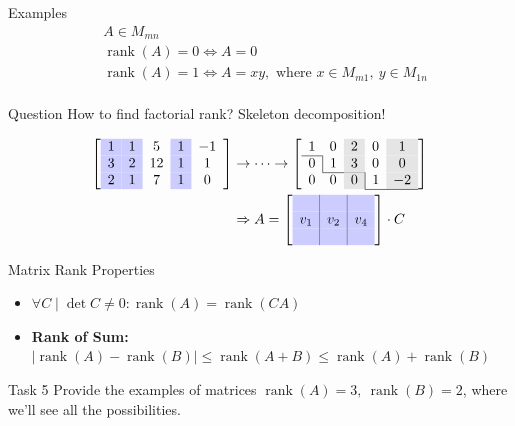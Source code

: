 \documentclass[fullscreen=true, bookmarks=true, hyperref={pdfencoding=unicode}]{beamer}
\begin{document}
\begin{frame}{Examples}
  \begin{align*}
    &A \in M_{mn} \\
    &\operatorname{rank}(A) = 0 \Leftrightarrow A = 0 \\
    &\operatorname{rank}(A) = 1 \Leftrightarrow A = xy, \text{ where } x \in M_{m1},\  y \in M_{1n} \\
  \end{align*}
  \vspace{-1cm}
  \begin{block}{Question}
    How to find factorial rank? Skeleton decomposition!
  \end{block}
  \pause
  \begin{align*}
    \left[\begin{array}{>{\columncolor{blue!20}}c >{\columncolor{blue!20}}c c >{\columncolor{blue!20}}c c}
      1 & 1 & 5 & 1 & -1 \\
      3 & 2 & 12 & 1 & 1 \\
      2 & 1 & 7 & 1 & 0 
    \end{array}\right] &\to \dots \to 
    \left[\begin{array}{c c >{\columncolor{gray!20}}c c >{\columncolor{gray!20}}c}
      1 & 0 & 2 & 0 & 1 \\
      \cline{1-1}
      0 & \multicolumn{1}{|c}{1} & 3 & 0 & 0 \\
      \cline{2-3}
      0 & 0 & 0 & \multicolumn{1}{|c}{1} & -2 \\
      \cline{4-5}
      \end{array}\right] \\
      & \Rightarrow A = 
      \left[\begin{array}{>{\columncolor{blue!20}}c|>{\columncolor{blue!20}}c|>{\columncolor{blue!20}}c}
        &     &    \\
        v_1 & v_2 & v_4 \\
            &     &    
      \end{array}\right] \cdot C 
  \end{align*}
\end{frame}


\begin{frame}{Matrix Rank Properties}
  \begin{itemize}
    \item $\forall C \mid \det C \neq 0: \operatorname{rank}(A) = \operatorname{rank}(CA)$
    \pause
    \item \textbf{Rank of Sum:} $|\operatorname{rank}(A) - \operatorname{rank}(B)| \le \operatorname{rank}(A+B) \le \operatorname{rank}(A) + \operatorname{rank}(B)$
  \end{itemize}

  \vspace{1cm}
  \begin{block}{Task 5}
    Provide the examples of matrices 
    $\operatorname{rank}(A) = 3,\ \operatorname{rank}(B) = 2$,
    where we'll see all the possibilities.
  \end{block}
\end{frame}
\end{document}

